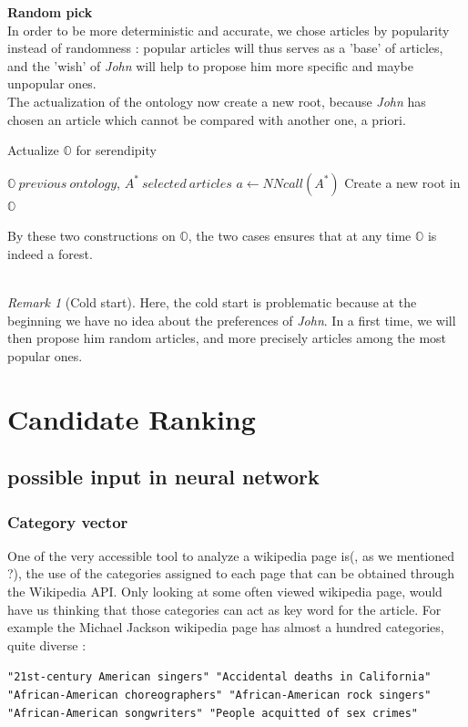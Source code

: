 \documentclass[11pt]{article}
\theoremstyle{plain}
\theoremstyle{definition}
\theoremstyle{remark}
\newtheorem*{rem}{Remark}
\begin{document}
\textbf{Random pick}\\
In order to be more deterministic and accurate, we chose articles by popularity instead of randomness : popular articles will thus serves as a 'base' of articles, and the 'wish' of \textit{John} will help to propose him more specific and maybe unpopular ones.\\


The actualization of the ontology now create a new root, because \textit{John} has chosen an article which cannot be compared with another one, a priori. 
\begin{algorithm}[h!]
	\caption{Actualize $\mathbb{O}$ for serendipity}
	\begin{algorithmic}
		\REQUIRE $\mathbb{O} \: previous \: ontology$, $A^* \: selected \: articles$
		\STATE $a\leftarrow NNcall(A^*)$
		\STATE Create a new root in $\mathbb{O}$
	\end{algorithmic}
\end{algorithm}

By these two constructions on $\mathbb{O}$, the two cases ensures that at any time $\mathbb{O}$ is indeed a forest. \\\\

\begin{rem}[Cold start]
Here, the cold start is problematic because at the beginning we have no idea about the preferences of \textit{John}. In a first time, we will then propose him random articles, and more precisely articles among the most popular ones. 
\end{rem}


\section{Candidate Ranking}

\subsection{possible input in neural network}

\subsubsection{Category vector}

One of the very accessible tool to analyze a wikipedia page is(, as we mentioned ?), the use of the categories assigned to each page that can be obtained through the Wikipedia API.
Only looking at some often viewed wikipedia page, would have us thinking that those categories can act as key word for the article. For example the Michael Jackson wikipedia page has almost a hundred categories, quite diverse :
 \begin{center}
	\texttt{"21st-century American singers" "Accidental deaths in California" "African-American choreographers" "African-American rock singers" "African-American songwriters"  "People acquitted of sex crimes"}
 \end{center}
\end{document}
